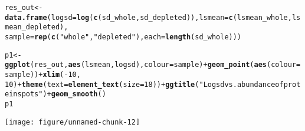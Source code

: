 \documentclass{article}\usepackage[]{graphicx}\usepackage[]{color}
\makeatletter
\def\maxwidth{ %
  \ifdim\Gin@nat@width>\linewidth
    \linewidth
  \else
    \Gin@nat@width
  \fi
}
\newcommand{\hlnum}[1]{\textcolor[rgb]{0.686,0.059,0.569}{#1}}%
\newcommand{\hlstr}[1]{\textcolor[rgb]{0.192,0.494,0.8}{#1}}%
\newcommand{\hlopt}[1]{\textcolor[rgb]{0,0,0}{#1}}%
\newcommand{\hlstd}[1]{\textcolor[rgb]{0.345,0.345,0.345}{#1}}%
\newcommand{\hlkwb}[1]{\textcolor[rgb]{0.69,0.353,0.396}{#1}}%
\newcommand{\hlkwc}[1]{\textcolor[rgb]{0.333,0.667,0.333}{#1}}%
\newcommand{\hlkwd}[1]{\textcolor[rgb]{0.737,0.353,0.396}{\textbf{#1}}}%
\newenvironment{kframe}{%
 \def\at@end@of@kframe{}%
 \ifinner\ifhmode%
  \def\at@end@of@kframe{\end{minipage}}%
  \begin{minipage}{\columnwidth}%
 \fi\fi%
 \def\FrameCommand##1{\hskip\@totalleftmargin \hskip-\fboxsep
 \colorbox{shadecolor}{##1}\hskip-\fboxsep
     \hskip-\linewidth \hskip-\@totalleftmargin \hskip\columnwidth}%
 \MakeFramed {\advance\hsize-\width
   \@totalleftmargin\z@ \linewidth\hsize
   \@setminipage}}%
 {\par\unskip\endMakeFramed%
 \at@end@of@kframe}
\newenvironment{knitrout}{}{} %
\makeatother
\begin{document}
\begin{knitrout}
\color{fgcolor}\begin{kframe}
\begin{alltt}
\hlstd{res_out} \hlkwb{<-} \hlkwd{data.frame}\hlstd{(}\hlkwc{logsd} \hlstd{=} \hlkwd{log}\hlstd{(}\hlkwd{c}\hlstd{(sd_whole, sd_depleted)),} \hlkwc{lsmean} \hlstd{=} \hlkwd{c}\hlstd{(lsmean_whole, lsmean_depleted),}
    \hlkwc{sample} \hlstd{=} \hlkwd{rep}\hlstd{(}\hlkwd{c}\hlstd{(}\hlstr{"whole"}\hlstd{,} \hlstr{"depleted"}\hlstd{),} \hlkwc{each} \hlstd{=} \hlkwd{length}\hlstd{(sd_whole)))}


\hlstd{p1} \hlkwb{<-} \hlkwd{ggplot}\hlstd{(res_out,} \hlkwd{aes}\hlstd{(lsmean, logsd),} \hlkwc{colour} \hlstd{= sample)} \hlopt{+} \hlkwd{geom_point}\hlstd{(}\hlkwd{aes}\hlstd{(}\hlkwc{colour} \hlstd{= sample))} \hlopt{+} \hlkwd{xlim}\hlstd{(}\hlopt{-}\hlnum{10}\hlstd{,}
    \hlnum{10}\hlstd{)} \hlopt{+} \hlkwd{theme}\hlstd{(}\hlkwc{text} \hlstd{=} \hlkwd{element_text}\hlstd{(}\hlkwc{size} \hlstd{=} \hlnum{18}\hlstd{))} \hlopt{+} \hlkwd{ggtitle}\hlstd{(}\hlstr{"Logsd vs. abundance of protein spots"}\hlstd{)} \hlopt{+} \hlkwd{geom_smooth}\hlstd{()}
\hlstd{p1}
\end{alltt}
\end{kframe}
\texttt{[image: figure/unnamed-chunk-12]} 

\end{knitrout}
\end{document}
